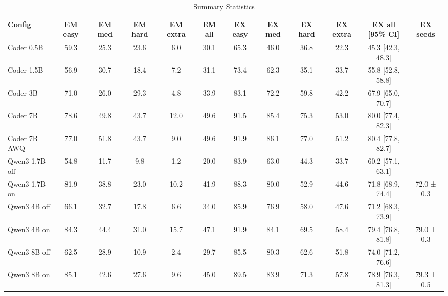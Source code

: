 \begin{table}[!htbp]
\centering
\caption{Summary Statistics}
\label{tab:3}
\small
\begin{adjustbox}{max width=\linewidth}
\begin{tabular}{@{}lccccccccccc@{}}
\toprule
Config & EM easy & EM med & EM hard & EM extra & EM all & EX easy & EX med & EX hard & EX extra & \makecell{EX all \\ {}[95\% CI]} & EX seeds \\
\midrule
Coder 0.5B & 59.3 & 25.3 & 23.6 & 6.0 & 30.1 & 65.3 & 46.0 & 36.8 & 22.3 & 45.3 [42.3, 48.3] &  \\
Coder 1.5B & 56.9 & 30.7 & 18.4 & 7.2 & 31.1 & 73.4 & 62.3 & 35.1 & 33.7 & 55.8 [52.8, 58.8] &  \\
Coder 3B & 71.0 & 26.0 & 29.3 & 4.8 & 33.9 & 83.1 & 72.2 & 59.8 & 42.2 & 67.9 [65.0, 70.7] &  \\
Coder 7B & 78.6 & 49.8 & 43.7 & 12.0 & 49.6 & 91.5 & 85.4 & 75.3 & 53.0 & 80.0 [77.4, 82.3] &  \\
Coder 7B AWQ & 77.0 & 51.8 & 43.7 & 9.0 & 49.6 & 91.9 & 86.1 & 77.0 & 51.2 & 80.4 [77.8, 82.7] &  \\
Qwen3 1.7B off & 54.8 & 11.7 & 9.8 & 1.2 & 20.0 & 83.9 & 63.0 & 44.3 & 33.7 & 60.2 [57.1, 63.1] &  \\
Qwen3 1.7B on & 81.9 & 38.8 & 23.0 & 10.2 & 41.9 & 88.3 & 80.0 & 52.9 & 44.6 & 71.8 [68.9, 74.4] & 72.0 ± 0.3 \\
Qwen3 4B off & 66.1 & 32.7 & 17.8 & 6.6 & 34.0 & 85.9 & 76.9 & 58.0 & 47.6 & 71.2 [68.3, 73.9] &  \\
Qwen3 4B on & 84.3 & 44.4 & 31.0 & 15.7 & 47.1 & 91.9 & 84.1 & 69.5 & 58.4 & 79.4 [76.8, 81.8] & 79.0 ± 0.3 \\
Qwen3 8B off & 62.5 & 28.9 & 10.9 & 2.4 & 29.7 & 85.5 & 80.3 & 62.6 & 51.8 & 74.0 [71.2, 76.6] &  \\
Qwen3 8B on & 85.1 & 42.6 & 27.6 & 9.6 & 45.0 & 89.5 & 83.9 & 71.3 & 57.8 & 78.9 [76.3, 81.3] & 79.3 ± 0.5 \\
\bottomrule
\end{tabular}
\end{adjustbox}
\par{}
\end{table}

